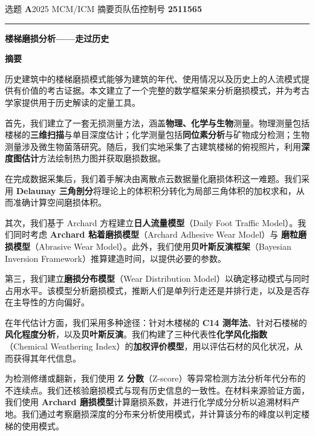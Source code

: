 \documentclass[11pt,a4paper]{ctexart}
\begin{document}
\thispagestyle{empty}

\begin{center}
{\small 选题 \textbf{A}\hfill 2025 MCM/ICM 摘要页\hfill 队伍控制号 \textbf{2511565}}\\[6pt]
\rule{\textwidth}{0.8pt}
\end{center}

\vspace{6pt}
\begin{center}
{\LARGE\bfseries 楼梯磨损分析——走过历史}
\end{center}

\vspace{4pt}
\begin{center}
{\large\bfseries 摘\quad 要}
\end{center}

历史建筑中的楼梯磨损模式能够为建筑的年代、使用情况以及历史上的人流模式提供有价值的考古证据。本文建立了一个完整的数学框架来分析磨损模式，并为考古学家提供用于历史解读的定量工具。

首先，我们建立了一套无损测量方法，涵盖\textbf{物理、化学与生物}测量。物理测量包括楼梯的\textbf{三维扫描}与单目深度估计；化学测量包括\textbf{同位素分析}与矿物成分检测；生物测量涉及微生物菌落研究。随后，我们实地采集了古建筑楼梯的俯视照片，利用\textbf{深度图估计}方法绘制热力图并获取磨损数据。

在完成数据采集后，我们着手解决由离散点云数据量化磨损体积这一难题。我们采用 \textbf{Delaunay 三角剖分}将理论上的体积积分转化为局部三角体积的加权求和，从而准确计算空间磨损体积。

其次，我们基于 Archard 方程建立\textbf{日人流量模型}（Daily Foot Traffic Model）。我们同时考虑 \textbf{Archard 粘着磨损模型}（Archard Adhesive Wear Model）与 \textbf{磨粒磨损模型}（Abrasive Wear Model）。此外，我们使用\textbf{贝叶斯反演框架}（Bayesian Inversion Framework）推算建造时间，以提供必要的参数。

第三，我们建立\textbf{磨损分布模型}（Wear Distribution Model）以确定移动模式与同时占用水平。该模型分析磨损模式，推断人们是单列行走还是并排行走，以及是否存在主导性的方向偏好。

在年代估计方面，我们采用多种途径：针对木楼梯的 \textbf{C14 测年法}、针对石楼梯的\textbf{风化程度分析}，以及\textbf{贝叶斯反演}。我们构建了三种代表性\textbf{化学风化指数}（Chemical Weathering Index）的\textbf{加权评价模型}，用以评估石材的风化状况，从而获得其年代信息。

为检测修缮或翻新，我们使用 \textbf{Z 分数}（Z-score）等异常检测方法分析年代分布的不连续点。我们还核验磨损模式与现有历史信息的一致性。在材料来源验证方面，我们使用 \textbf{Archard 磨损模型}计算磨损系数，并进行化学成分分析以追溯材料产地。我们通过考察磨损深度的分布来分析使用模式，并计算该分布的峰度以判定楼梯的使用模式。
\end{document}
